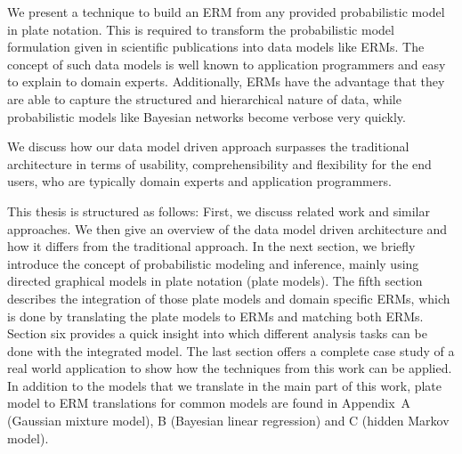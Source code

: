 We present a technique to build an ERM from any provided probabilistic model in plate notation. This is required to transform the probabilistic model formulation given in scientific publications into data models like ERMs. The concept of such data models is well known to application programmers and easy to explain to domain experts. Additionally, ERMs have the advantage that they are able to capture the structured and hierarchical nature of data, while probabilistic models like Bayesian networks become verbose very quickly.

We discuss how our data model driven approach surpasses the traditional architecture in terms of usability, comprehensibility and flexibility for the end users, who are typically domain experts and application programmers.

This thesis is structured as follows: First, we discuss related work and similar approaches. We then give an overview of the data model driven architecture and how it differs from the traditional approach. In the next section, we briefly introduce the concept of probabilistic modeling and inference, mainly using directed graphical models in plate notation (plate models). The fifth section describes the integration of those plate models and domain specific ERMs, which is done by translating the plate models to ERMs and matching both ERMs. Section six provides a quick insight into which different analysis tasks can be done with the integrated model. The last section offers a complete case study of a real world application to show how the techniques from this work can be applied. In addition to the models that we translate in the main part of this work, plate model to ERM translations for common models are found in Appendix~A (Gaussian mixture model), B (Bayesian linear regression) and C (hidden Markov model).
